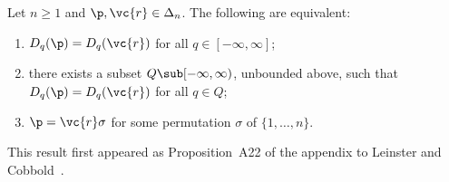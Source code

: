 \begin{lemma}
Let $n \geq 1$ and $\p, \vc{r} \in \Delta_n$.  The following are
equivalent:
% 
\begin{enumerate}
\item 
{}
$D_q(\p) = D_q(\vc{r})$ for all $q \in [-\infty, \infty]$;

\item
{}
there exists a subset $Q \sub [-\infty, \infty)$, unbounded above, such
that $D_q(\p) = D_q(\vc{r})$ for all $q \in Q$;

\item
{}
$\p = \vc{r}\sigma$ for some permutation $\sigma$ of $\{1, \ldots, n\}$.
\end{enumerate}
\end{lemma}

This result first appeared as Proposition~A22 of the appendix to Leinster
and Cobbold~\cite{MDISS}.

